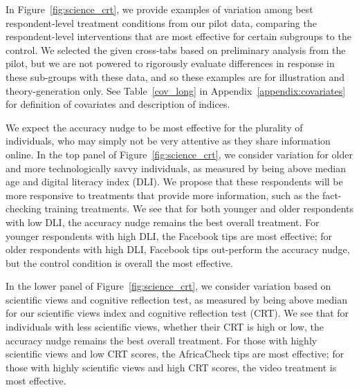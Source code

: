 \documentclass[letterpaper, 12pt, parskip=full,DIV=10]{scrartcl}
\begin{document}


{In Figure}~\ref{fig:science_crt}{, we provide examples of variation among best respondent-level treatment conditions from our pilot data, comparing the respondent-level interventions that are most effective for certain subgroups to the control. We selected the given cross-tabs based on preliminary analysis from the pilot, but we are not powered to rigorously evaluate differences in response in these sub-groups with these data, and so these examples are for illustration and theory-generation only. See Table}~\ref{cov_long} {in Appendix}~\ref{appendix:covariates} {for definition of covariates and description of indices. }

{We expect the accuracy nudge to be most effective for the plurality of individuals, who may simply not be very attentive as they share information online.} {In the top panel of Figure}~\ref{fig:science_crt}{, we consider variation for older and more technologically savvy individuals, as measured by being above median age and digital literacy index (DLI). We propose that these respondents will be more responsive to treatments that provide more information, such as the fact-checking training treatments. We see that for both younger and older respondents with low DLI, the accuracy nudge remains the best overall treatment. For younger respondents with high DLI, the Facebook tips are most effective; for older respondents with high DLI, Facebook tips out-perform the accuracy nudge, but the control condition is overall the most effective. }

{In the lower panel of Figure}~\ref{fig:science_crt}{, we consider variation based on scientific views and cognitive reflection test, as measured by being above median for our scientific views index and cognitive reflection test (CRT). We see that for individuals with less scientific views, whether their CRT is high or low, the accuracy nudge remains the best overall treatment. For those with highly scientific views and low CRT scores, the AfricaCheck tips are most effective; for those with highly scientific views and high CRT scores, the video treatment is most effective. }
\end{document}
